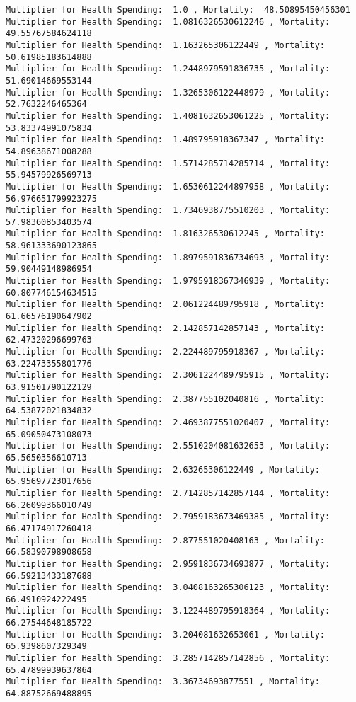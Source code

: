 \documentclass[11pt]{article}
\begin{document}
    \begin{Verbatim}[commandchars=\\\{\}]
Multiplier for Health Spending:  1.0 , Mortality:  48.50895450456301
Multiplier for Health Spending:  1.0816326530612246 , Mortality:  49.55767584624118
Multiplier for Health Spending:  1.163265306122449 , Mortality:  50.61985183614888
Multiplier for Health Spending:  1.2448979591836735 , Mortality:  51.69014669553144
Multiplier for Health Spending:  1.3265306122448979 , Mortality:  52.7632246465364
Multiplier for Health Spending:  1.4081632653061225 , Mortality:  53.83374991075834
Multiplier for Health Spending:  1.489795918367347 , Mortality:  54.89638671008288
Multiplier for Health Spending:  1.5714285714285714 , Mortality:  55.94579926569713
Multiplier for Health Spending:  1.6530612244897958 , Mortality:  56.976651799923275
Multiplier for Health Spending:  1.7346938775510203 , Mortality:  57.98360853403574
Multiplier for Health Spending:  1.816326530612245 , Mortality:  58.961333690123865
Multiplier for Health Spending:  1.8979591836734693 , Mortality:  59.90449148986954
Multiplier for Health Spending:  1.9795918367346939 , Mortality:  60.807746154634515
Multiplier for Health Spending:  2.061224489795918 , Mortality:  61.66576190647902
Multiplier for Health Spending:  2.142857142857143 , Mortality:  62.47320296699763
Multiplier for Health Spending:  2.224489795918367 , Mortality:  63.22473355801776
Multiplier for Health Spending:  2.3061224489795915 , Mortality:  63.91501790122129
Multiplier for Health Spending:  2.387755102040816 , Mortality:  64.53872021834832
Multiplier for Health Spending:  2.4693877551020407 , Mortality:  65.09050473108073
Multiplier for Health Spending:  2.5510204081632653 , Mortality:  65.5650356610713
Multiplier for Health Spending:  2.63265306122449 , Mortality:  65.95697723017656
Multiplier for Health Spending:  2.7142857142857144 , Mortality:  66.26099366010749
Multiplier for Health Spending:  2.7959183673469385 , Mortality:  66.47174917260418
Multiplier for Health Spending:  2.877551020408163 , Mortality:  66.58390798908658
Multiplier for Health Spending:  2.9591836734693877 , Mortality:  66.59213433187688
Multiplier for Health Spending:  3.0408163265306123 , Mortality:  66.4910924222495
Multiplier for Health Spending:  3.1224489795918364 , Mortality:  66.27544648185722
Multiplier for Health Spending:  3.204081632653061 , Mortality:  65.9398607329349
Multiplier for Health Spending:  3.2857142857142856 , Mortality:  65.47899939637864
Multiplier for Health Spending:  3.36734693877551 , Mortality:  64.88752669488895

\end{Verbatim}
\end{document}
